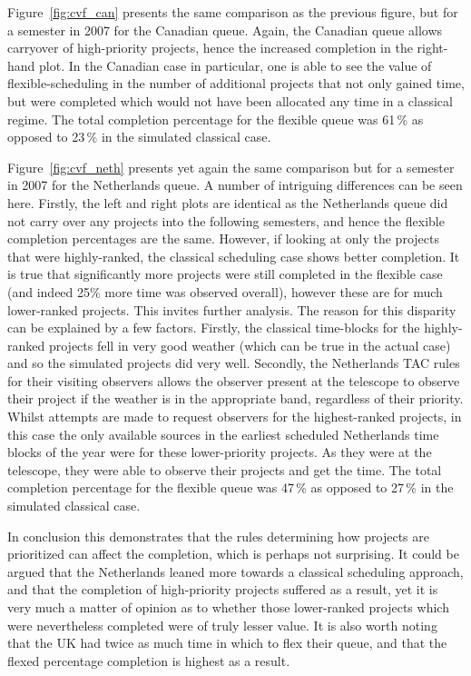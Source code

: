 \documentclass[]{spie}  %
\begin{document}
Figure~\ref{fig:cvf_can} presents the same comparison as the previous
figure, but for a semester in 2007 for the Canadian queue. Again, the
Canadian queue allows carryover of high-priority projects, hence the
increased completion in the right-hand plot. In the Canadian case in
particular, one is able to see the value of flexible-scheduling in the
number of additional projects that not only gained time, but were
completed which would not have been allocated any time in a classical
regime. The total completion percentage for the flexible queue was
61\,\% as opposed to 23\,\% in the simulated classical case.

Figure~\ref{fig:cvf_neth} presents yet again the same comparison but
for a semester in 2007 for the Netherlands queue. A number of
intriguing differences can be seen here. Firstly, the left and right
plots are identical as the Netherlands queue did not carry over any
projects into the following semesters, and hence the flexible
completion percentages are the same. However, if looking at only the
projects that were highly-ranked, the classical scheduling case shows
better completion. It is true that significantly more projects were
still completed in the flexible case (and indeed 25\% more time was
observed overall), however these are for much lower-ranked
projects. This invites further analysis. The reason for this disparity
can be explained by a few factors. Firstly, the classical time-blocks
for the highly-ranked projects fell in very good weather (which can be
true in the actual case) and so the simulated projects did very
well. Secondly, the Netherlands TAC rules for their visiting observers
allows the observer present at the telescope to observe their project
if the weather is in the appropriate band, regardless of their
priority. Whilst attempts are made to request observers for the
highest-ranked projects, in this case the only available sources in
the earliest scheduled Netherlands time blocks of the year were for
these lower-priority projects. As they were at the telescope, they
were able to observe their projects and get the time. The total
completion percentage for the flexible queue was 47\,\% as opposed to
27\,\% in the simulated classical case.

In conclusion this demonstrates that the rules determining how
projects are prioritized can affect the completion, which is perhaps
not surprising. It could be argued that the Netherlands leaned more
towards a classical scheduling approach, and that the completion of
high-priority projects suffered as a result, yet it is very much a
matter of opinion as to whether those lower-ranked projects which were
nevertheless completed were of truly lesser value. It is also worth
noting that the UK had twice as much time in which to flex their
queue, and that the flexed percentage completion is highest as a
result.
\end{document}

